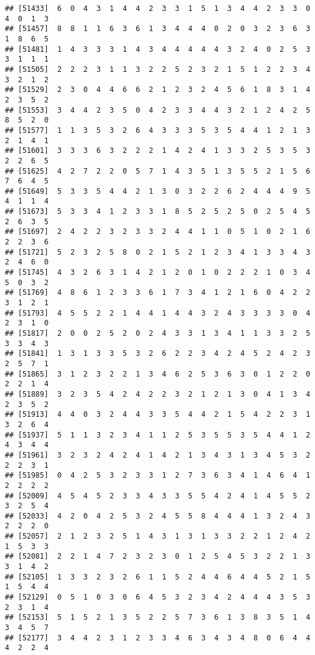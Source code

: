 \documentclass[
]{article}
\begin{document}
\begin{verbatim}
## [51433]  6  0  4  3  1  4  4  2  3  3  1  5  1  3  4  4  2  3  3  0  4  0  1  3
## [51457]  8  8  1  1  6  3  6  1  3  4  4  4  0  2  0  3  2  3  6  3  1  8  6  5
## [51481]  1  4  3  3  3  1  4  3  4  4  4  4  4  3  2  4  0  2  5  3  3  1  1  1
## [51505]  2  2  2  3  1  1  3  2  2  5  2  3  2  1  5  1  2  2  3  4  3  2  1  2
## [51529]  2  3  0  4  4  6  6  2  1  2  3  2  4  5  6  1  8  3  1  4  2  3  5  2
## [51553]  3  4  4  2  3  5  0  4  2  3  3  4  4  3  2  1  2  4  2  5  8  5  2  0
## [51577]  1  1  3  5  3  2  6  4  3  3  3  5  3  5  4  4  1  2  1  3  2  1  4  1
## [51601]  3  3  3  6  3  2  2  2  1  4  2  4  1  3  3  2  5  3  5  3  2  2  6  5
## [51625]  4  2  7  2  2  0  5  7  1  4  3  5  1  3  5  5  2  1  5  6  7  6  4  5
## [51649]  5  3  3  5  4  4  2  1  3  0  3  2  2  6  2  4  4  4  9  5  4  1  1  4
## [51673]  5  3  3  4  1  2  3  3  1  8  5  2  5  2  5  0  2  5  4  5  2  6  3  5
## [51697]  2  4  2  2  3  2  3  3  2  4  4  1  1  0  5  1  0  2  1  6  2  2  3  6
## [51721]  5  2  3  2  5  8  0  2  1  5  2  1  2  3  4  1  3  3  4  3  2  4  6  0
## [51745]  4  3  2  6  3  1  4  2  1  2  0  1  0  2  2  2  1  0  3  4  5  0  3  2
## [51769]  4  8  6  1  2  3  3  6  1  7  3  4  1  2  1  6  0  4  2  2  3  1  2  1
## [51793]  4  5  5  2  2  1  4  4  1  4  4  3  2  4  3  3  3  3  0  4  2  3  1  0
## [51817]  2  0  0  2  5  2  0  2  4  3  3  1  3  4  1  1  3  3  2  5  3  3  4  3
## [51841]  1  3  1  3  3  5  3  2  6  2  2  3  4  2  4  5  2  4  2  3  2  5  7  1
## [51865]  3  1  2  3  2  2  1  3  4  6  2  5  3  6  3  0  1  2  2  0  2  2  1  4
## [51889]  3  2  3  5  4  2  4  2  2  3  2  1  2  1  3  0  4  1  3  4  2  3  5  2
## [51913]  4  4  0  3  2  4  4  3  3  5  4  4  2  1  5  4  2  2  3  1  3  2  6  4
## [51937]  5  1  1  3  2  3  4  1  1  2  5  3  5  5  3  5  4  4  1  2  4  3  4  4
## [51961]  3  2  3  2  4  2  4  1  4  2  1  3  4  3  1  3  4  5  3  2  2  2  3  1
## [51985]  0  4  2  5  3  2  3  3  1  2  7  3  6  3  4  1  4  6  4  1  2  2  2  2
## [52009]  4  5  4  5  2  3  3  4  3  3  5  5  4  2  4  1  4  5  5  2  3  2  5  4
## [52033]  4  2  0  4  2  5  3  2  4  5  5  8  4  4  4  1  3  2  4  3  2  2  2  0
## [52057]  2  1  2  3  2  5  1  4  3  1  3  1  3  3  2  2  1  2  4  2  1  5  3  3
## [52081]  2  2  1  4  7  2  3  2  3  0  1  2  5  4  5  3  2  2  1  3  3  1  4  2
## [52105]  1  3  3  2  3  2  6  1  1  5  2  4  4  6  4  4  5  2  1  5  1  5  4  4
## [52129]  0  5  1  0  3  0  6  4  5  3  2  3  4  2  4  4  4  3  5  3  2  3  1  4
## [52153]  5  1  5  2  1  3  5  2  2  5  7  3  6  1  3  8  3  5  1  4  3  4  5  7
## [52177]  3  4  4  2  3  1  2  3  3  4  6  3  4  3  4  8  0  6  4  4  4  2  2  4

\end{verbatim}
\end{document}
